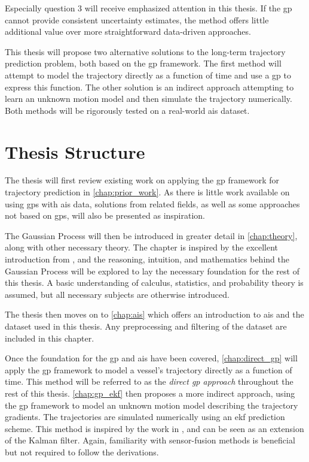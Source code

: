 Especially question 3 will receive emphasized attention in this thesis. If the \acrshort{gp} cannot provide consistent uncertainty estimates, the method offers little additional value over more straightforward data-driven approaches. 


This thesis will propose two alternative solutions to the long-term trajectory prediction problem, both based on the \acrshort{gp} framework. The first method will attempt to model the trajectory directly as a function of time and use a \acrshort{gp} to express this function. The other solution is an indirect approach attempting to learn an unknown motion model and then simulate the trajectory numerically. Both methods will be rigorously tested on a real-world \acrshort{ais} dataset.

\section{Thesis Structure}
The thesis will first review existing work on applying the \acrshort{gp} framework for trajectory prediction in \cref{chap:prior_work}. As there is little work available on using \acrshort{gp}s with \acrshort{ais} data, solutions from related fields, as well as some approaches not based on \acrshort{gp}s, will also be presented as inspiration. 

The Gaussian Process will then be introduced in greater detail in \cref{chap:theory}, along with other necessary theory. The chapter is inspired by the excellent introduction from \cite{rasmussen}, and the reasoning, intuition, and mathematics behind the Gaussian Process will be explored to lay the necessary foundation for the rest of this thesis. A basic understanding of calculus, statistics, and probability theory is assumed, but all necessary subjects are otherwise introduced.  

The thesis then moves on to \cref{chap:ais} which offers an introduction to \acrshort{ais} and the dataset used in this thesis. Any preprocessing and filtering of the dataset are included in this chapter.

Once the foundation for the \acrshort{gp} and \acrshort{ais} have been covered, \cref{chap:direct_gp} will apply the \acrshort{gp} framework to model a vessel's trajectory directly as a function of time. This method will be referred to as the \textit{direct \acrshort{gp} approach} throughout the rest of this thesis.
\cref{chap:gp_ekf} then proposes a more indirect approach, using the \acrshort{gp} framework to model an unknown motion model describing the trajectory gradients. The trajectories are simulated numerically using an \acrshort{ekf} prediction scheme. This method is inspired by the work in \cite{pedestrian,gpekf}, and can be seen as an extension of the Kalman filter. Again, familiarity with sensor-fusion methods is beneficial but not required to follow the derivations.

